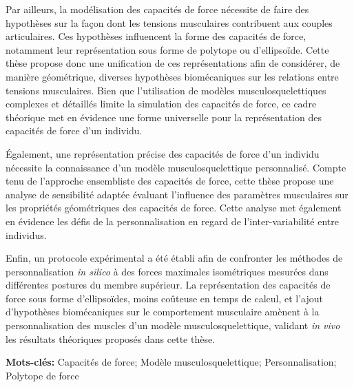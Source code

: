 Par ailleurs, la modélisation des capacités de force nécessite de faire des hypothèses sur la façon dont les tensions musculaires contribuent aux couples articulaires. Ces hypothèses influencent la forme des capacités de force, notamment leur représentation sous forme de polytope ou d'ellipsoïde. Cette thèse propose donc une unification de ces représentations afin de considérer, de manière géométrique, diverses hypothèses biomécaniques sur les relations entre tensions musculaires. Bien que l'utilisation de modèles musculosquelettiques complexes et détaillés limite la simulation des capacités de force, ce cadre théorique met en évidence une forme universelle pour la représentation des capacités de force d'un individu.

Également, une représentation précise des capacités de force d'un individu nécessite la connaissance d'un modèle musculosquelettique personnalisé. Compte tenu de l'approche ensembliste des capacités de force, cette thèse propose une analyse de sensibilité adaptée évaluant l'influence des paramètres musculaires sur les propriétés géométriques des capacités de force. Cette analyse met également en évidence les défis de la personnalisation en regard de l'inter-variabilité entre individus.

Enfin, un protocole expérimental a été établi afin de confronter les méthodes de personnalisation \emph{in silico} à des forces maximales isométriques mesurées dans différentes postures du membre supérieur. La représentation des capacités de force sous forme d'ellipsoïdes, moins coûteuse en temps de calcul, et l'ajout d'hypothèses biomécaniques sur le comportement musculaire amènent à la personnalisation des muscles d'un modèle musculosquelettique, validant \emph{in vivo} les résultats théoriques proposés dans cette thèse.

\textbf{Mots-clés:} Capacités de force; Modèle musculosquelettique; Personnalisation; Polytope de force